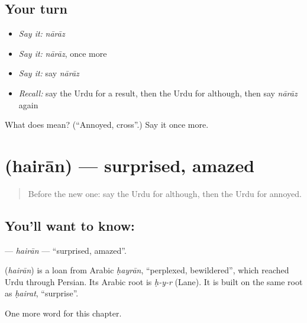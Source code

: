 \subsection*{Your turn}
\begin{itemize}
\raggedright
  \item \emph{Say it:} \emph{nārāz}
  \item \emph{Say it:} \emph{nārāz}, once more
  \item \emph{Say it:} say \emph{nārāz}
  \item \emph{Recall:} say the Urdu for a result, then the Urdu for although, then say \emph{nārāz} again
\end{itemize}

\begin{tcolorbox}[breakable,colback=teal!4,colframe=teal!35!black,title={Before you move on}]
What does  mean? (\textquotedblleft{}Annoyed, cross\textquotedblright{}.) Say it once more.
\end{tcolorbox}
\section[\texorpdfstring{\ur{حیران} (hairān)}{حیران (hairān)}]{ (hairān) — surprised, amazed}

\label{lesson:UR-C221-hairan}



\begin{quote}
Before the new one: say the Urdu for although, then the Urdu for annoyed.
\end{quote}

\subsection*{You'll want to know: }
\textbf{} — \emph{hairān} — \textquotedblleft{}surprised, amazed\textquotedblright{}.

\begin{cousinweb}
\textbf{} (\emph{hairān}) is a loan from Arabic \emph{ḥayrān}, \textquotedblleft{}perplexed, bewildered\textquotedblright{}, which reached Urdu through Persian. Its Arabic root is \emph{ḥ-y-r} (Lane). It is built on the same root as \emph{ḥairat}, \textquotedblleft{}surprise\textquotedblright{}.
\end{cousinweb}

\begin{grammarlens}[title={What you've built}]
One more word for this chapter.
\end{grammarlens}

